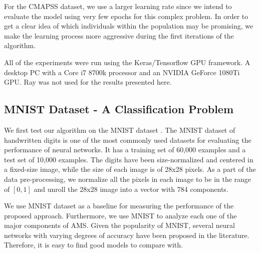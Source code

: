 \documentclass[12pt]{elsart}%
\begin{document}
\begin{table}[!htb]
\begin{center}
\caption{Training parameters for each of the used datasets.}
\label{table:training_params}
\vspace{12pt}
\end{center}
\end{table}

For the CMAPSS dataset, we use a larger learning rate since we intend to evaluate the model using very few epochs for this complex problem. In order to get a clear idea of which individuals within the population may be promising, we make the learning process more aggressive during the first iterations of the algorithm. 

All of the experiments were run using the Keras/Tensorflow GPU framework. A desktop PC with a Core i7 8700k processor and an NVIDIA GeForce 1080Ti GPU. Ray was not used for the results presented here.

\subsection{MNIST Dataset - A Classification Problem}

We first test our algorithm on the MNIST dataset \cite{Lecun1998}. The MNIST dataset of handwritten digits is one of the most commonly used datasets for evaluating the performance of neural networks. It has a training set of 60,000 examples and a test set of 10,000 examples. The digits have been size-normalized and centered in a fixed-size image, while the size of each image is of 28x28 pixels. As a part of the data pre-processing, we normalize all the pixels in each image to be in the range of $[0,1]$ and unroll the 28x28 image into a vector with 784 components.

We use MNIST dataset as a baseline for measuring the performance of the proposed approach. Furthermore, we use MNIST to analyze each one of the major components of AMS. Given the popularity of MNIST, several neural networks with varying degrees of accuracy have been proposed in the literature. Therefore, it is easy to find good models to compare with. 
\end{document}
